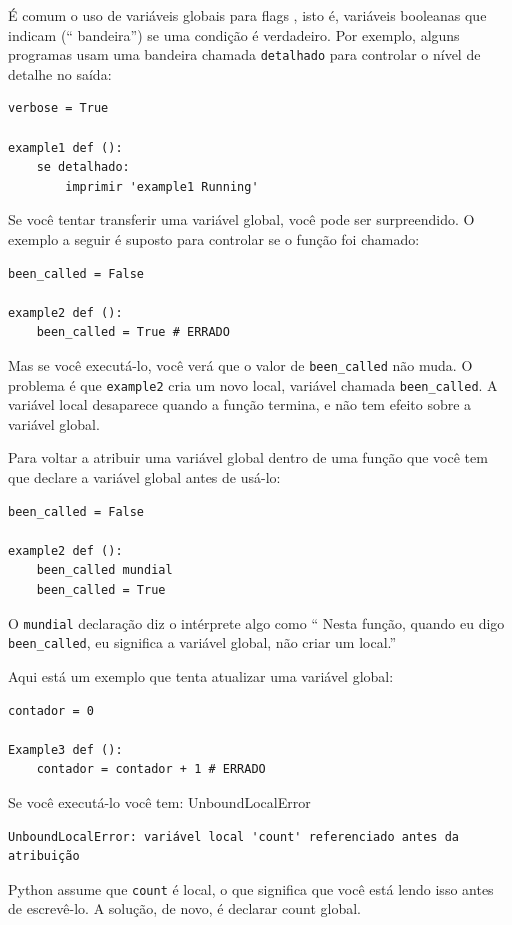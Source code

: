 \documentclass[10pt]{book}
\begin{document}
\begin{v erbatim}
É comum o uso de variáveis ​​globais para {flags \bf}, isto é, 
variáveis ​​booleanas que indicam (`` bandeira'') se uma condição
é verdadeiro. Por exemplo, alguns programas usam
uma bandeira chamada {\tt detalhado} para controlar o nível de detalhe no
saída:

\begin{verbatim}
verbose = True

example1 def ():
    se detalhado:
        imprimir 'example1 Running'
\end{verbatim}
%
Se você tentar transferir uma variável global, você pode ser surpreendido.
O exemplo a seguir é suposto para controlar se o
função foi chamado:

\begin{verbatim}
been_called = False

example2 def ():
    been_called = True # ERRADO
\end{verbatim}
%
Mas se você executá-lo, você verá que o valor de \verb "been_called"
não muda. O problema é que {\tt example2} cria um novo local,
variável chamada \verb "been_called". A variável local desaparece quando
a função termina, e não tem efeito sobre a variável global.

Para voltar a atribuir uma variável global dentro de uma função que você tem que
{\bf} declare a variável global antes de usá-lo:

\begin{verbatim}
been_called = False

example2 def ():
    been_called mundial 
    been_called = True
\end{verbatim}
%
O {\tt mundial} declaração diz o intérprete
algo como `` Nesta função, quando eu digo \verb "been_called", eu
significa a variável global, não criar um local.''

Aqui está um exemplo que tenta atualizar uma variável global:

\begin{verbatim}
contador = 0

Example3 def ():
    contador = contador + 1 # ERRADO
\end{verbatim}
%
Se você executá-lo você tem:
\index{} UnboundLocalError

\begin{verbatim}
UnboundLocalError: variável local 'count' referenciado antes da atribuição
\end{verbatim}
%
Python assume que {\tt count} é local, o que significa
que você está lendo isso antes de escrevê-lo. A solução, de novo,
é declarar {count \tt} global.


\end{v erbatim}
\end{document}
